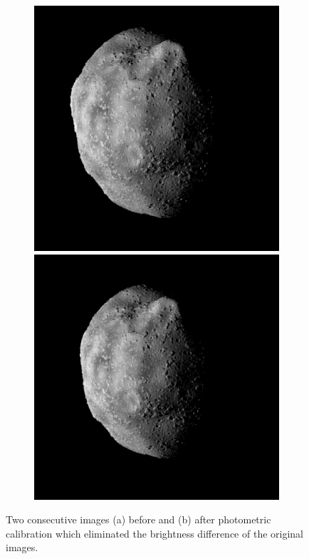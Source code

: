 \begin{figure}[htb]
\begin{subfigure}[b]{0.25\textwidth}
        \caption{}
        \label{fig:t_photometry_1}
    \end{subfigure}
    \begin{subfigure}[b]{0.25\textwidth}
        \centering
        \includegraphics[width=\textwidth]{doc/thesis/0_figures/rendering_lighting/After_1.png}
        \includegraphics[width=\textwidth]{doc/thesis/0_figures/rendering_lighting/After_2.png}
        \caption{}
        \label{fig:t_photometry_3}
    \end{subfigure}
    \caption{Two consecutive images (a) before and (b) after photometric calibration which eliminated the brightness difference of the original images.}
    \label{fig:t_photometry}
\end{figure}


